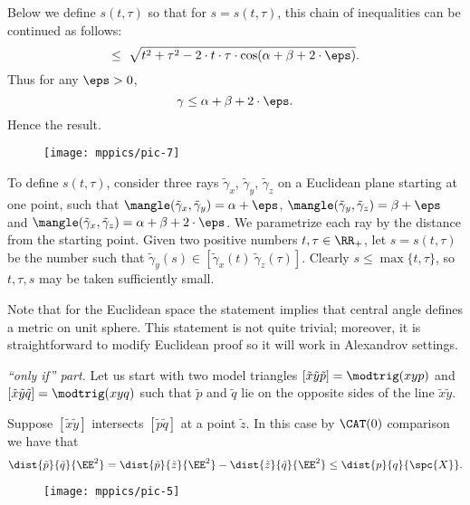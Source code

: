Below we define 
$s(t,\tau)$ so that for 
$s=s(t,\tau)$, this chain of inequalities can be continued as follows:
\[\le
\ \sqrt{t^2+\tau^2-2\cdot t\cdot \tau\cdot \cos(\alpha+\beta+2\cdot \eps)}.
\]
Thus for any $\eps>0$, 
\[\gamma\le \alpha+\beta+2\cdot \eps.\]
Hence the result.

\begin{wrapfigure}{o}{30 mm}
\vskip-8mm
\centering
\texttt{[image: mppics/pic-7]}
\end{wrapfigure}

To define $s(t,\tau)$, consider three rays $\tilde \gamma_x$, $\tilde \gamma_y$, $\tilde \gamma_z$ on a Euclidean plane starting at one point, such that $\mangle(\tilde \gamma_x,\tilde \gamma_y)=\alpha+\eps$,
$\mangle(\tilde \gamma_y,\tilde \gamma_z)=\beta+\eps$ and $\mangle(\tilde \gamma_x,\tilde \gamma_z)=\alpha+\beta+2\cdot \eps$.
We parametrize each ray by the distance from the starting point.
Given two positive numbers $t,\tau\in\RR_+$, let $s=s(t,\tau)$ be 
the number such that 
$\tilde \gamma_y(s)\in[\tilde \gamma_x(t)\ \tilde \gamma_z(\tau)]$. 
Clearly $s\le\max\{t,\tau\}$, so $t,\tau,s$ may be taken sufficiently small.

Note that for the Euclidean space the statement implies that central angle defines a metric on unit sphere.
This statement is not quite trivial; moreover, it is straightforward to modify Euclidean proof so it will work in Alexandrov settings. 

 \textit{``only if'' part.}
Let us start with two model triangles $[\tilde x\tilde y\tilde p]=\modtrig(xyp)$ and $[\tilde x\tilde y\tilde q]=\modtrig(xyq)$ such that $\tilde p$ and $\tilde q$ lie on the opposite sides of the line $\tilde x\tilde y$.

Suppose $[\tilde x \tilde y]$ intersects $[\tilde p\tilde q]$ at a point $\tilde z$.
In this case by $\CAT(0)$ comparison we have that
\[\dist{\tilde p}{\tilde q}{\EE^2}=\dist{\tilde p}{\tilde z}{\EE^2}-\dist{\tilde z}{\tilde q}{\EE^2}\le \dist{p}{q}{\spc{X}}.\]

\begin{wrapfigure}[8]{o}{30 mm}
\vskip-2mm
\centering
\texttt{[image: mppics/pic-5]}
\end{wrapfigure}

